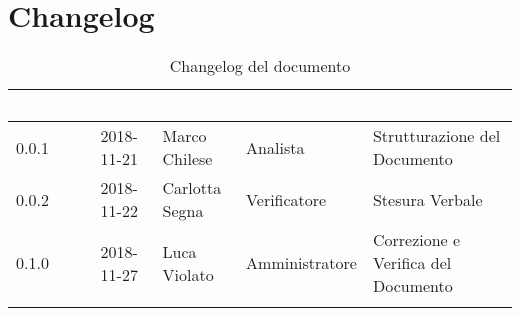 \newpage

\section{Changelog}

\begin{center}
\begin{longtable}[c]{|m{}|m{}|m{}|m{}|p{}|}
\hline
\rowcolor{bluelogo}\textbf{\textcolor{white}{Versione}} & \textbf{\textcolor{white}{Data}} & \textbf{\textcolor{white}{Autore}} & \textbf{\textcolor{white}{Ruolo}} & \textbf{\textcolor{white}{Descrizione}}\\
\hline \hline
\endfirsthead
0.0.1 & 2018-11-21 & Marco Chilese & Analista & Strutturazione del Documento \\
\rowcolor{grigio} 0.0.2 & 2018-11-22 & Carlotta Segna & Verificatore & Stesura Verbale \\
\hline
0.1.0 & 2018-11-27 & Luca Violato & Amministratore & Correzione e Verifica del Documento\\
\hline
\caption{Changelog del documento}
\end{longtable}
\end{center}
